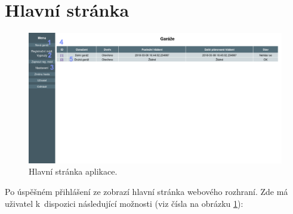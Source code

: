 \newpage

\section{Hlavní stránka}

\begin{figure}[h!]
    \centering
    \includegraphics[width=\textwidth]{images/mainpage.png}
    \caption[Hlavní stránka aplikace]{Hlavní stránka aplikace.}
    \label{fig:mainpage}
\end{figure}

Po úspěšném přihlášení ze zobrazí hlavní stránka webového rozhraní. Zde má uživatel k~dispozici následující možnosti (viz čísla na obrázku \ref{fig:mainpage}):

